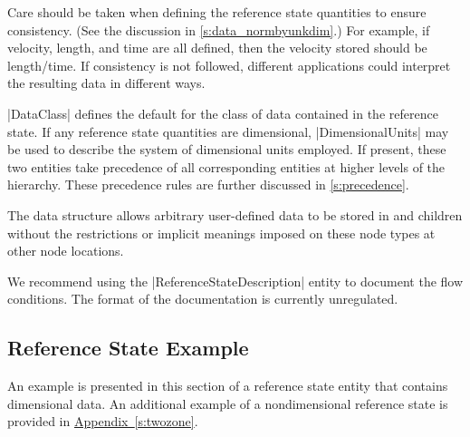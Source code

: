 Care should be taken when defining the reference state quantities to
ensure consistency.
(See the discussion in \autoref{s:data_normbyunkdim}.)
For example, if velocity, length, and time are all defined, then the
velocity stored should be length/time.
If consistency is not followed, different applications could interpret
the resulting data in different ways.

|DataClass| defines the default for the class of data contained in the
reference state.
If any reference state quantities are dimensional, |DimensionalUnits|
may be used to describe the system of dimensional units employed.
If present, these two entities take precedence of all corresponding
entities at higher levels of the hierarchy.
These precedence rules are further discussed in \autoref{s:precedence}.

The  data structure allows arbitrary
user-defined data to be stored in  and
 children without the restrictions or implicit
meanings imposed on these node types at other node locations.

We recommend using the |ReferenceStateDescription| entity to document
the flow conditions.  The format of the documentation is currently
unregulated.

\subsection{Reference State Example}

An example is presented in this section of a reference state entity that
contains dimensional data.
An additional example of a nondimensional reference state is provided in
\hyperref[s:twozone]{Appendix~\ref*{s:twozone}}.

